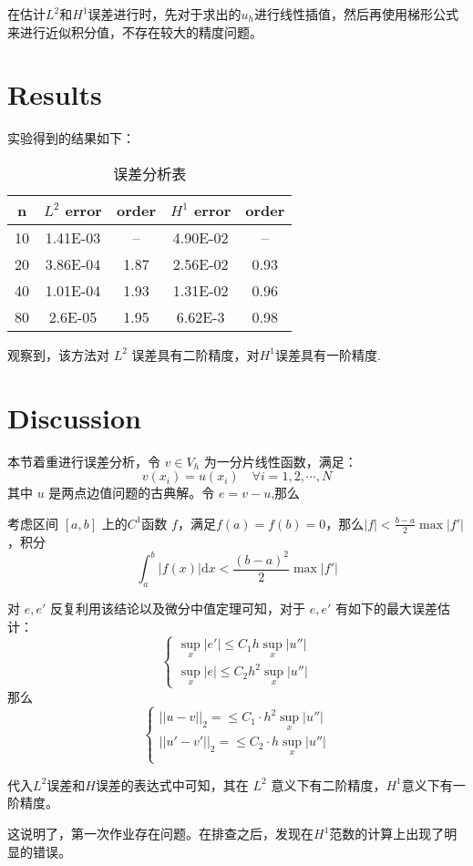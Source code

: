 \documentclass{ctexart}
\begin{document}
在估计$L^2$和$H^1$误差进行时，先对于求出的$u_h$进行线性插值，然后再使用梯形公式来进行近似积分值，不存在较大的精度问题。

\section{Results}

实验得到的结果如下：
\newpage

\begin{table}[h!]
\caption{\label{table.label} 误差分析表} \centering
\bigskip
\begin{small}
\begin{tabular}{|c|cc|cc|}
  \hline
  n &$L^2 $ error & order &$ H^1$ error & order\\\hline
10&   1.41E-03  &  --   &  4.90E-02 &  -- \\
20&   3.86E-04  &  1.87 & 2.56E-02 &  0.93\\
40&   1.01E-04  &  1.93 & 1.31E-02 &  0.96 \\
80&   2.6E-05  &  1.95 & 6.62E-3 &  0.98\\\hline
\end{tabular}
\end{small}
\end{table}

观察到，该方法对 $L^2$ 误差具有二阶精度，对$H^1$误差具有一阶精度. 

\section{Discussion}
本节着重进行误差分析，令 $v \in V_h$ 为一分片线性函数，满足：
\begin{equation}
    v(x_i) = u(x_i)\quad \forall i = 1, 2, \cdots, N
\end{equation}
其中 $u$ 是两点边值问题的古典解。令 $e = v - u$,那么

考虑区间 $[a,b]$ 上的$C^1$函数 $f$，满足$f(a) = f(b) = 0$，那么$|f| < \frac{b-a}{2} \max|f'|$，积分
\begin{equation}
    \int_a^b |f(x)| \mathrm d x < \frac{(b-a)^2}{2} \max | f'|
\end{equation}

对 $e, e'$ 反复利用该结论以及微分中值定理可知，对于 $e, e'$ 有如下的最大误差估计：
\begin{equation}
\begin{cases}
    \sup _ x | e' | \le C_1 h \sup_x | u''|\\
    \sup _ x | e | \le C_2 h ^ 2 \sup_x | u''|
\end{cases}
\end{equation}
那么
\begin{equation}
\begin{cases}
    || u - v||_2 = \le C_1 \cdot h^2 \sup_x|u'' |\\
    || u' - v'||_2 = \le C_2 \cdot h \sup_x|u'' |\\
\end{cases}
\end{equation}

代入$L^2$误差和$H$误差的表达式中可知，其在 $L^2$ 意义下有二阶精度，$H^1$意义下有一阶精度。

\begin{flushleft}
    这说明了，第一次作业存在问题。在排查之后，发现在$H^1$范数的计算上出现了明显的错误。
\end{flushleft}
\end{document}
